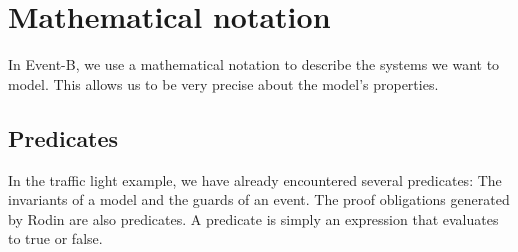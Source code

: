 \newcommand{\lascii}[1]{\qquad\quad \textrm{ASCII: } \texttt{#1}}
\newcommand{\inascii}[1]{(ASCII: \texttt{#1})}

\section{Mathematical notation}
\label{tut_mathematical_notation}
In Event-B, we use a mathematical notation to describe the systems we want to model.
This allows us to be very precise about the model's properties.

\subsection{Predicates}
\label{tut_predicates}
In the traffic light example, we have already encountered several predicates: The invariants of a model and the guards of an event. The proof obligations generated by Rodin are also predicates.  A predicate is simply an expression that evaluates to true or false.

